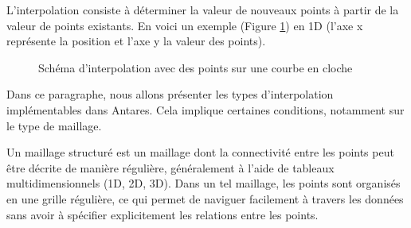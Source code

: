 L'interpolation consiste à déterminer la valeur de nouveaux points à partir de la valeur de points existants. En voici un exemple (Figure \ref{fig:interpolation_cloche_points}) en \ac{1D} (l'axe x représente la position et l'axe y la valeur des points).

\vspace{0,5cm}


\begin{figure}[H]
    \centering
    \caption{Schéma d'interpolation avec des points sur une courbe en cloche}
    \label{fig:interpolation_cloche_points}
\end{figure}

Dans ce paragraphe, nous allons présenter les types d'interpolation \cite{cassiopee2015} implémentables dans Antares.
Cela implique certaines conditions, notamment sur le type de maillage.

Un maillage structuré est un maillage dont la connectivité\label{connectivité} entre les points peut être décrite de manière régulière, généralement à l'aide de tableaux multidimensionnels (1D, 2D, 3D). Dans un tel maillage, les points sont organisés en une grille régulière, ce qui permet de naviguer facilement à travers les données sans avoir à spécifier explicitement les relations entre les points.

